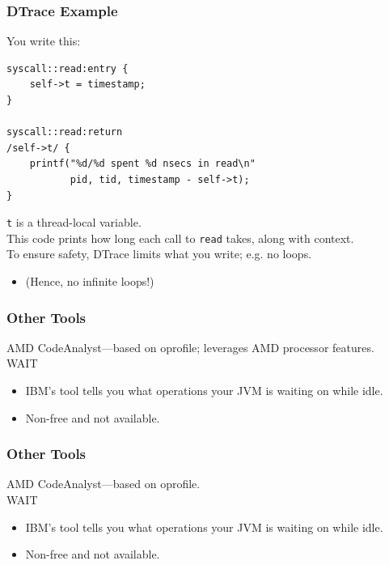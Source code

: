 \begin{frame}[fragile]
  \frametitle{DTrace Example}


  You write this:

  \begin{lstlisting}
syscall::read:entry {
    self->t = timestamp;
}

syscall::read:return
/self->t/ {
    printf("%d/%d spent %d nsecs in read\n"
           pid, tid, timestamp - self->t);
}
  \end{lstlisting}

    {\tt t} is a thread-local variable.\\
    This code prints how long each call to {\tt read} takes, along with
      context.\\[1em]
    To ensure safety, DTrace limits what you write; e.g. no loops.
      \begin{itemize}
        \item (Hence, no infinite loops!)
      \end{itemize}


\end{frame}

\begin{frame}[fragile]
  \frametitle{Other Tools}


    AMD CodeAnalyst---based on oprofile; leverages AMD processor features.\\[1em]

    WAIT
      \begin{itemize}
        \item IBM's tool tells you what operations your JVM is waiting on while
          idle.
        \item Non-free and not available.
      \end{itemize}

\end{frame}

\begin{frame}[fragile]
  \frametitle{Other Tools}


    AMD CodeAnalyst---based on oprofile.\\[1em]

    WAIT
      \begin{itemize}
        \item IBM's tool tells you what operations your JVM is waiting on while
          idle.
        \item Non-free and not available.
      \end{itemize}

\end{frame}

